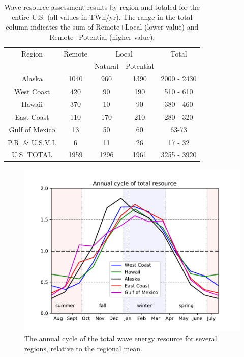 \begin{table}[ht]
  \centering
  \begin{tabular}{|c|c|c|c|c|}
    \hline
    Region & Remote & \multicolumn{2}{c}{Local} & Total \\
    & & Natural & Potential & \\
    \hline
    Alaska & 1040 & 960 & 1390 & 2000 - 2430 \\
    West Coast & 420 & 90 & 190 & 510 - 610 \\
    Hawaii & 370 & 10 & 90 & 380 - 460 \\
    East Coast & 110 & 170 & 210 & 280 - 320 \\
    Gulf of Mexico & 13 & 50 & 60 & 63-73 \\
    P.R. \& U.S.V.I. & 6 & 11 & 26 & 17 - 32 \\
    \hline \hline
U.S. TOTAL & 1959 & 1296 & 1961 & 3255 - 3920 \\
\hline
  \end{tabular}
  \caption{Wave resource assessment results by region and totaled for the entire U.S. (all values in TWh/yr). The range in the total column indicates the sum of Remote+Local (lower value) and Remote+Potential (higher value). }
  \label{table:totals}
\end{table}

\begin{figure}[ht]
  \centering
  \includegraphics[width=\textwidth]{../fig/AnnualCycle01.pdf}
  \caption[Wave resource annual cycle.]{The annual cycle of the total wave energy resource for several regions, relative to the regional mean.}
  \label{fig:annual-cycle}
\end{figure}


